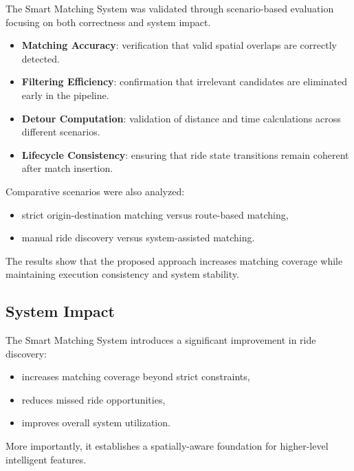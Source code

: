 The Smart Matching System was validated through scenario-based evaluation focusing on both correctness and system impact.

\begin{itemize}
    \item \textbf{Matching Accuracy}: verification that valid spatial overlaps are correctly detected.
    
    \item \textbf{Filtering Efficiency}: confirmation that irrelevant candidates are eliminated early in the pipeline.
    
    \item \textbf{Detour Computation}: validation of distance and time calculations across different scenarios.
    
\item \textbf{Lifecycle Consistency}: ensuring that ride state transitions remain coherent after match insertion.
\end{itemize}

Comparative scenarios were also analyzed:

\begin{itemize}
    \item strict origin-destination matching versus route-based matching,
    \item manual ride discovery versus system-assisted matching.
\end{itemize}

The results show that the proposed approach increases matching coverage while maintaining execution consistency and system stability.

\vspace{-0.6cm}
\subsection{System Impact}

The Smart Matching System introduces a significant improvement in ride discovery:

\begin{itemize}
    \item increases matching coverage beyond strict constraints,
    \item reduces missed ride opportunities,
    \item improves overall system utilization.
\end{itemize}

More importantly, it establishes a spatially-aware foundation for higher-level intelligent features.
\clearpage
